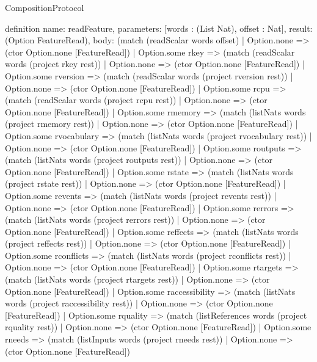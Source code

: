\begin{lexlean}{CompositionProtocol}
\begin{semanticmodule}
definition{
  name: readFeature,
  parameters: [words : (List Nat), offset : Nat],
  result: (Option FeatureRead),
  body: (match (readScalar words offset)
    | Option.none => (ctor Option.none [FeatureRead])
    | Option.some rkey => (match (readScalar words (project rkey rest))
      | Option.none => (ctor Option.none [FeatureRead])
      | Option.some rversion => (match (readScalar words (project rversion rest))
        | Option.none => (ctor Option.none [FeatureRead])
        | Option.some rcpu => (match (readScalar words (project rcpu rest))
          | Option.none => (ctor Option.none [FeatureRead])
          | Option.some rmemory => (match (listNats words (project rmemory rest))
            | Option.none => (ctor Option.none [FeatureRead])
            | Option.some rvocabulary => (match (listNats words (project rvocabulary rest))
              | Option.none => (ctor Option.none [FeatureRead])
              | Option.some routputs => (match (listNats words (project routputs rest))
                | Option.none => (ctor Option.none [FeatureRead])
                | Option.some rstate => (match (listNats words (project rstate rest))
                  | Option.none => (ctor Option.none [FeatureRead])
                  | Option.some revents => (match (listNats words (project revents rest))
                    | Option.none => (ctor Option.none [FeatureRead])
                    | Option.some rerrors => (match (listNats words (project rerrors rest))
                      | Option.none => (ctor Option.none [FeatureRead])
                      | Option.some reffects => (match (listNats words (project reffects rest))
                        | Option.none => (ctor Option.none [FeatureRead])
                        | Option.some rconflicts => (match (listNats words (project rconflicts rest))
                          | Option.none => (ctor Option.none [FeatureRead])
                          | Option.some rtargets => (match (listNats words (project rtargets rest))
                            | Option.none => (ctor Option.none [FeatureRead])
                            | Option.some raccessibility => (match (listNats words (project raccessibility rest))
                              | Option.none => (ctor Option.none [FeatureRead])
                              | Option.some rquality => (match (listReferences words (project rquality rest))
                                | Option.none => (ctor Option.none [FeatureRead])
                                | Option.some rneeds => (match (listInputs words (project rneeds rest))
                                  | Option.none => (ctor Option.none [FeatureRead])
}
\end{semanticmodule}
\end{lexlean}
